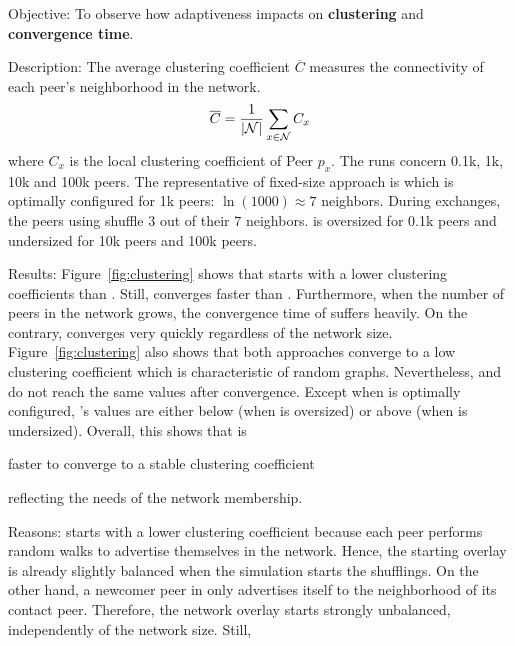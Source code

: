 \begin{asparadesc}
\item[Objective:] To observe how adaptiveness impacts on \textbf{clustering} and
  \textbf{convergence time}.
\item[Description:] The average clustering coefficient $\overline{C}$ measures
  the connectivity of each peer's neighborhood in the network.
  \begin{equation}
    \overline{C} = {1\over |\mathcal{N}|}\sum\limits_{x\in\mathcal{N}}C_x
  \end{equation}
  where $C_x$ is the local clustering coefficient of Peer $p_x$.  The runs
  concern 0.1k, 1k, 10k and 100k peers. The representative of fixed-size
  approach is \CYCLON which is optimally configured for 1k peers:
  $\ln(1000)\approx 7$ neighbors. During exchanges, the peers using \CYCLON
  shuffle $3$ out of their $7$ neighbors. \CYCLON is oversized for 0.1k peers
  and undersized for 10k peers and 100k peers.
\item[Results:] Figure~\ref{fig:clustering} shows that \CYCLON starts
  with a lower clustering coefficients than \SPRAY. Still, \SPRAY
  converges faster than \CYCLON. Furthermore, when the number of peers
  in the network grows, the convergence time of \CYCLON suffers
  heavily. On the contrary, \SPRAY converges very quickly
  regardless of the network size. Figure~\ref{fig:clustering} also
  shows that both approaches converge to a low clustering coefficient
  which is characteristic of random graphs. Nevertheless, \CYCLON and
  \SPRAY do not reach the same values after convergence. Except when
  \CYCLON is optimally configured, \SPRAY's values are either below
  (when \CYCLON is oversized) or above (when \CYCLON is undersized).
  Overall, this shows that \SPRAY is
  \begin{inparaenum}
  \item faster to converge to a stable clustering coefficient
  \item reflecting the needs of the network membership.
  \end{inparaenum}
\item[Reasons:] \CYCLON starts with a lower clustering coefficient because each
  peer performs random walks to advertise themselves in the network. Hence, the
  starting overlay is already slightly balanced when the simulation starts the
  shufflings. On the other hand, a newcomer peer in \SPRAY only advertises
  itself to the neighborhood of its contact peer. Therefore, the network overlay
  starts strongly unbalanced, independently of the network size. Still, \CYCLON

\end{asparadesc}
